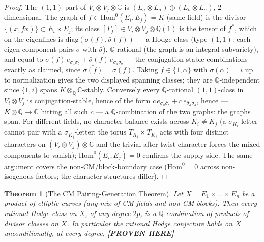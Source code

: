\documentclass[11pt]{article}
\newtheorem{theorem}{Theorem}
\newcommand{\PROVEN}{\textbf{[PROVEN HERE]}}
\newcommand{\Q}{\mathbb{Q}}
\newcommand{\C}{\mathbb{C}}
\newcommand{\Hom}{\mathrm{Hom}}
\begin{document}
\begin{proof}
The $(1,1)$-part of $V_i\otimes V_j\otimes\C$ is
$(L_\sigma\otimes L_{\bar\sigma})\oplus(L_{\bar\sigma}\otimes L_\sigma)$,
$2$-dimensional. The graph of $f\in\Hom^0(E_i,E_j)=K$ (same field) is
the divisor $\{(x,fx)\}\subset E_i\times E_j$; its class
$[\Gamma_f]\in V_i\otimes V_j\otimes\Q(1)$ is the tensor of $f^*$, which
on the eigenlines is $\mathrm{diag}(\sigma(f),\bar\sigma(f))$ --- a
Hodge class (type $(1,1)$: each eigen-component pairs $\sigma$ with
$\bar\sigma$), $\Q$-rational (the graph is an integral subvariety), and
equal to
$\sigma(f)\,e_{\sigma_a\bar\sigma_b}+\bar\sigma(f)\,e_{\bar\sigma_a\sigma_b}$
--- the conjugation-stable combinations exactly as claimed, since
$\bar{\sigma(f)}=\bar\sigma(f)$. Taking $f\in\{1,\alpha\}$ with
$\sigma(\alpha)=i$ up to normalization gives the two displayed spanning
classes; they are $\Q$-independent since
$\{1,i\}$ spans $K\otimes_\Q\C$-stably. Conversely every
$\Q$-rational $(1,1)$-class in $V_i\otimes V_j$ is
conjugation-stable, hence of the form
$c\,e_{\sigma_a\bar\sigma_b}+\bar c\,e_{\bar\sigma_a\sigma_b}$, hence ---
$K\otimes\Q\to\C$ hitting all such $c$ --- a $\Q$-combination of the two
graphs: the graphs span. For different fields, no character balance
exists across $K_i\neq K_j$ (a $\sigma_{K_i}$-letter cannot pair with a
$\sigma_{K_j}$-letter: the torus
$T_{K_i}\times T_{K_j}$ acts with four distinct characters on
$(V_i\otimes V_j)\otimes\C$ and the trivial-after-twist character forces
the mixed components to vanish); $\Hom^0(E_i,E_j)=0$ confirms the supply
side. The same argument covers the non-CM/block-boundary case
($\Hom^0=0$ across non-isogenous factors; the character structures
differ).
\end{proof}

\begin{theorem}[The CM Pairing-Generation Theorem]\label{thm:s11}
Let $X=E_1\times\dots\times E_n$ be a product of elliptic curves
(any mix of CM fields and non-CM blocks). Then every rational Hodge
class on $X$, of any degree $2p$, is a $\Q$-combination of products of
divisor classes on $X$. In particular the rational Hodge conjecture
holds on $X$ unconditionally, at every degree.
\PROVEN{}
\end{theorem}
\end{document}
